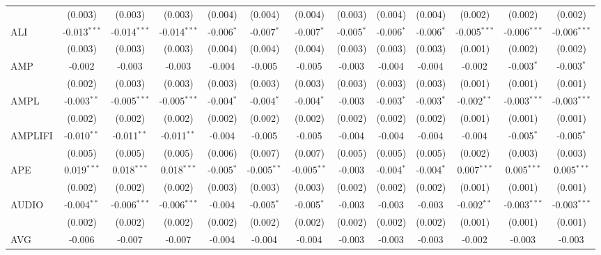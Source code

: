 \begin{table}[!htbp]
\begin{tabular}{@{\extracolsep{5pt}}lcccccccccccc}
  & (0.003) & (0.003) & (0.003) & (0.004) & (0.004) & (0.004) & (0.003) & (0.004) & (0.004) & (0.002) & (0.002) & (0.002) \\
 ALI & -0.013$^{***}$ & -0.014$^{***}$ & -0.014$^{***}$ & -0.006$^{*}$ & -0.007$^{*}$ & -0.007$^{*}$ & -0.005$^{*}$ & -0.006$^{*}$ & -0.006$^{*}$ & -0.005$^{***}$ & -0.006$^{***}$ & -0.006$^{***}$ \\
  & (0.003) & (0.003) & (0.003) & (0.004) & (0.004) & (0.004) & (0.003) & (0.003) & (0.003) & (0.001) & (0.002) & (0.002) \\
 AMP & -0.002$^{}$ & -0.003$^{}$ & -0.003$^{}$ & -0.004$^{}$ & -0.005$^{}$ & -0.005$^{}$ & -0.003$^{}$ & -0.004$^{}$ & -0.004$^{}$ & -0.002$^{}$ & -0.003$^{*}$ & -0.003$^{*}$ \\
  & (0.002) & (0.003) & (0.003) & (0.003) & (0.003) & (0.003) & (0.003) & (0.003) & (0.003) & (0.001) & (0.001) & (0.001) \\
 AMPL & -0.003$^{**}$ & -0.005$^{***}$ & -0.005$^{***}$ & -0.004$^{*}$ & -0.004$^{*}$ & -0.004$^{*}$ & -0.003$^{}$ & -0.003$^{*}$ & -0.003$^{*}$ & -0.002$^{**}$ & -0.003$^{***}$ & -0.003$^{***}$ \\
  & (0.002) & (0.002) & (0.002) & (0.002) & (0.002) & (0.002) & (0.002) & (0.002) & (0.002) & (0.001) & (0.001) & (0.001) \\
 AMPLIFI & -0.010$^{**}$ & -0.011$^{**}$ & -0.011$^{**}$ & -0.004$^{}$ & -0.005$^{}$ & -0.005$^{}$ & -0.004$^{}$ & -0.004$^{}$ & -0.004$^{}$ & -0.004$^{}$ & -0.005$^{*}$ & -0.005$^{*}$ \\
  & (0.005) & (0.005) & (0.005) & (0.006) & (0.007) & (0.007) & (0.005) & (0.005) & (0.005) & (0.002) & (0.003) & (0.003) \\
 APE & 0.019$^{***}$ & 0.018$^{***}$ & 0.018$^{***}$ & -0.005$^{*}$ & -0.005$^{**}$ & -0.005$^{**}$ & -0.003$^{}$ & -0.004$^{*}$ & -0.004$^{*}$ & 0.007$^{***}$ & 0.005$^{***}$ & 0.005$^{***}$ \\
  & (0.002) & (0.002) & (0.002) & (0.003) & (0.003) & (0.003) & (0.002) & (0.002) & (0.002) & (0.001) & (0.001) & (0.001) \\
 AUDIO & -0.004$^{**}$ & -0.006$^{***}$ & -0.006$^{***}$ & -0.004$^{}$ & -0.005$^{*}$ & -0.005$^{*}$ & -0.003$^{}$ & -0.003$^{}$ & -0.003$^{}$ & -0.002$^{**}$ & -0.003$^{***}$ & -0.003$^{***}$ \\
  & (0.002) & (0.002) & (0.002) & (0.002) & (0.002) & (0.002) & (0.002) & (0.002) & (0.002) & (0.001) & (0.001) & (0.001) \\
 AVG & -0.006$^{}$ & -0.007$^{}$ & -0.007$^{}$ & -0.004$^{}$ & -0.004$^{}$ & -0.004$^{}$ & -0.003$^{}$ & -0.003$^{}$ & -0.003$^{}$ & -0.002$^{}$ & -0.003$^{}$ & -0.003$^{}$ \\

\end{tabular}
\end{table}
